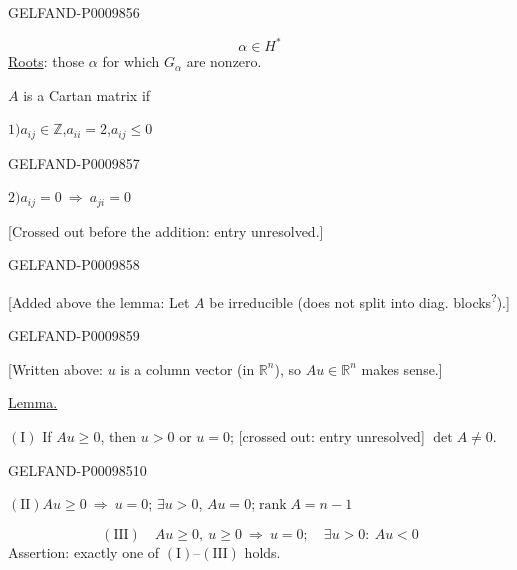 \begin{GelfandAdjacentEvidence}{GELFAND-P000985}{6}

\[
\alpha\in H^*
\]
\underline{Roots}: those $\alpha$ for which $G_\alpha$ are nonzero.

$A$ is a Cartan matrix if

$1)$\quad $a_{ij}\in\mathbb Z$,\qquad $a_{ii}=2$,\qquad $a_{ij}\le 0$

\end{GelfandAdjacentEvidence}
\begin{GelfandAdjacentEvidence}{GELFAND-P000985}{7}


$2)$\quad $a_{ij}=0\ \Rightarrow\ a_{ji}=0$

[Crossed out before the addition: entry unresolved.]
\end{GelfandAdjacentEvidence}
\begin{GelfandAdjacentEvidence}{GELFAND-P000985}{8}


[Added above the lemma: Let $A$ be irreducible (does not split into diag. blocks\textsuperscript{?}).]
\end{GelfandAdjacentEvidence}
\begin{GelfandAdjacentEvidence}{GELFAND-P000985}{9}


[Written above: $u$ is a column vector (in $\mathbb R^n$), so $Au\in\mathbb R^n$ makes sense.]

\underline{Lemma.}

$(\mathrm I)$ If $Au\ge0$, then $u>0$ or $u=0$; [crossed out: entry unresolved] $\det A\ne0$.
\end{GelfandAdjacentEvidence}
\begin{GelfandAdjacentEvidence}{GELFAND-P000985}{10}


$(\mathrm{II})$\quad $Au\ge0\ \Rightarrow\ u=0$;
\quad $\exists u>0$, $Au=0$;\quad $\operatorname{rank}A=n-1$

\end{GelfandAdjacentEvidence}

\[
(\mathrm{III})\quad Au\ge0,\ u\ge0\ \Rightarrow\ u=0;
\quad \exists u>0:\ Au<0
\]
Assertion: exactly one of $(\mathrm I)$–$(\mathrm{III})$ holds.


